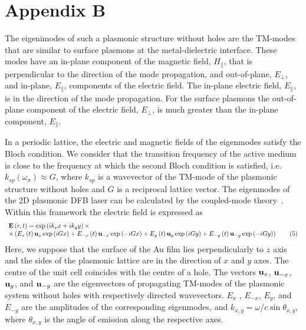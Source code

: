 \documentclass[aps,pra,amsmath,amssymb,onecolumn,superscriptaddress,showpacs,floatfix,]{revtex4-1}
\begin{document}
\section*{Appendix B}
The eigenimodes of such a plasmonic structure without holes are the TM-modes that are similar to surface plasmons at the metal-dielectric interface.
These modes have an in-plane component of the magnetic field, $H_{\parallel}$, that is perpendicular to the direction of the mode propagation, and out-of-plane, $E_{\perp}$, and in-plane, $E_{\parallel}$, components of the electric field.
The in-plane electric field, $E_{\parallel}$, is in the direction of the mode propagation.
For the surface plasmons the out-of-plane component of the electric field, $E_{\perp}$, is much greater than the in-plane component, $E_{\parallel}$.

In a periodic lattice, the electric and magnetic fields of the eigenmodes satisfy the Bloch condition. 
We consider that the transition frequency of the active medium is close to the frequency at which the second Bloch condition is satisfied, i.e. $k_{sp}(\omega_{\sigma}) \approx G$, where $k_{sp}$ is a wavevector of the TM-mode of the plasmonic structure without holes and $G$ is a reciprocal lattice vector. 
The eigenmodes of the 2D plasmonic DFB laser can be calculated by the coupled-mode theory~\cite{ExterOptExp,TennerJOpt}. 
Within this framework the electric field is expressed as
\begin{equation}
\begin{array}{l}
{\bf{E}}\left( {r,t} \right) = \exp \left( {i{k_x}x + i{k_y}y} \right) \times \\
\times \left( {{E_x}\left( t \right){{\bf{u}}_x}\exp \left( {iGx} \right) + {E_{ - x}}\left( t \right){{\bf{u}}_{ - x}}\exp \left( { - iGx} \right) + {E_y}\left( t \right){{\bf{u}}_y}\exp \left( {iGy} \right) + {E_{ - y}}\left( t \right){{\bf{u}}_{ - y}}\exp \left( { - iGy} \right)} \right)\tag{5}
\end{array}
\end{equation}
Here, we suppose that the surface of the Au film lies perpendicularly to $z$ axis and the sides of the plasmonic lattice are in the direction of $x$ and $y$ axes. 
The centre of the unit cell coincides with the centre of a hole.
The vectors ${{\bf{u}}_x}$,  ${{\bf{u}}_{ - x}}$, ${{\bf{u}}_y}$, and ${{\bf{u}}_{ - y}}$  are the eigenvectors of propagating TM-modes of the plasmonic system without holes with respectively directed wavevectors.
${E_x}$ , ${E_{ - x}}$,  ${E_y}$, and ${E_{ - y}}$  are the amplitudes of the corresponding eigenmodes, and ${k_{x,y}} = \omega /c\sin {\theta _{x,y}}$, where ${\theta _{x,y}}$ is the angle of emission along the respective axes.
\end{document}
